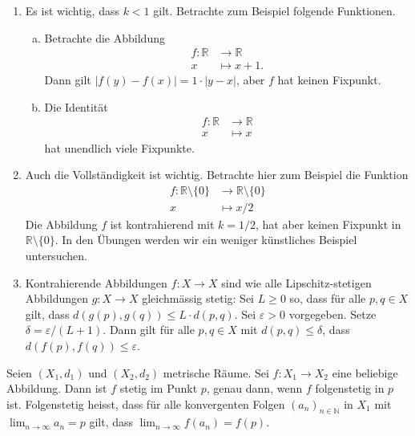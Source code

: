 \documentclass[../main.tex]{subfiles}
\begin{document}
\begin{remarks}
  \leavevmode
  \begin{enumerate}[(1)]
    \item Es ist wichtig, dass $k < 1$ gilt.
      Betrachte zum Beispiel folgende Funktionen.
      \begin{enumerate}[(a)]
        \item Betrachte die Abbildung
          \begin{align*}
            f \colon \mathbb{R} & \to \mathbb{R} \\
            x & \mapsto x + 1.
          \end{align*}
          Dann gilt $|f(y) - f(x)| = 1 \cdot |y - x|$,
          aber $f$ hat keinen Fixpunkt.
        \item Die Identität
          \begin{align*}
            f \colon \mathbb{R} & \to \mathbb{R} \\
            x & \mapsto x
          \end{align*}
          hat unendlich viele Fixpunkte.
      \end{enumerate}
    \item Auch die Vollständigkeit ist wichtig.
      Betrachte hier zum Beispiel die Funktion
      \begin{align*}
        f \colon \mathbb{R} \setminus \{0\} & \to \mathbb{R} \setminus \{0\} \\
        x & \mapsto x/2
      \end{align*}
      Die Abbildung $f$ ist kontrahierend mit $k = 1/2$,
      hat aber keinen Fixpunkt in $\mathbb{R} \setminus \{0\}$.
      In den Übungen werden wir ein weniger künstliches Beispiel
      untersuchen.
    \item
      Kontrahierende Abbildungen $f \colon X \to X$
      sind wie alle Lipschitz-stetigen Abbildungen
      $g \colon X \to X$ gleichmässig stetig:
      Sei $L \geq 0$ so, dass für alle
      $p, q \in X$
      gilt, dass
      $d(g(p), g(q)) \leq L \cdot d(p, q)$.
      Sei $\varepsilon > 0$ vorgegeben.
      Setze $\delta = \varepsilon/(L+1)$.
      Dann gilt für alle $p, q \in X$ mit $d(p, q) \leq \delta$,
      dass $d(f(p), f(q)) \leq \varepsilon$.
  \end{enumerate}
\end{remarks}

\begin{lemma*}
  Seien $(X_1, d_1)$ und $(X_2, d_2)$ metrische Räume.
  Sei $f \colon X_1 \to X_2$ eine beliebige Abbildung.
  Dann ist $f$ stetig im Punkt $p$, genau dann, wenn $f$
  folgenstetig in $p$ ist.
  Folgenstetig heisst, dass für alle konvergenten Folgen
  ${(a_{n})}_{n \in \mathbb{N}}$ in $X_1$ mit
  $\lim_{n \to \infty} a_n = p$ gilt,
  dass $\lim_{n \to \infty} f(a_n) = f(p)$.
\end{lemma*}
\end{document}
